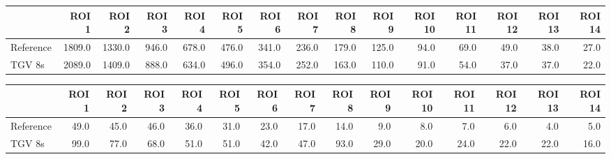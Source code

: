 \begin{tabular}{lrrrrrrrrrrrrrr}
\toprule
{} &   ROI 1 &   ROI 2 &  ROI 3 &  ROI 4 &  ROI 5 &  ROI 6 &  ROI 7 &  ROI 8 &  ROI 9 &  ROI 10 &  ROI 11 &  ROI 12 &  ROI 13 &  ROI 14 \\
\midrule
Reference &  1809.0 &  1330.0 &  946.0 &  678.0 &  476.0 &  341.0 &  236.0 &  179.0 &  125.0 &    94.0 &    69.0 &    49.0 &    38.0 &    27.0 \\
TGV 8s    &  2089.0 &  1409.0 &  888.0 &  634.0 &  496.0 &  354.0 &  252.0 &  163.0 &  110.0 &    91.0 &    54.0 &    37.0 &    37.0 &    22.0 \\
\bottomrule
\end{tabular}
\begin{tabular}{lrrrrrrrrrrrrrr}
\toprule
{} &  ROI 1 &  ROI 2 &  ROI 3 &  ROI 4 &  ROI 5 &  ROI 6 &  ROI 7 &  ROI 8 &  ROI 9 &  ROI 10 &  ROI 11 &  ROI 12 &  ROI 13 &  ROI 14 \\
\midrule
Reference &   49.0 &   45.0 &   46.0 &   36.0 &   31.0 &   23.0 &   17.0 &   14.0 &    9.0 &     8.0 &     7.0 &     6.0 &     4.0 &     5.0 \\
TGV 8s    &   99.0 &   77.0 &   68.0 &   51.0 &   51.0 &   42.0 &   47.0 &   93.0 &   29.0 &    20.0 &    24.0 &    22.0 &    22.0 &    16.0 \\
\bottomrule
\end{tabular}
